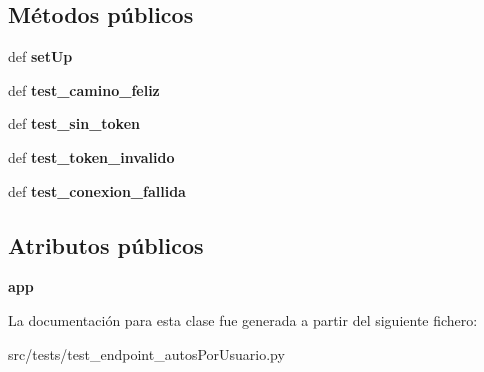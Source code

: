\subsection*{Métodos públicos}
\begin{DoxyCompactItemize}
\item 
\hypertarget{classsrc_1_1tests_1_1test__endpoint__autos_por_usuario_1_1_test_endpoint_autos_por_usuario_a3a4a1f4eaf7c91de538f0da6fb3a1982}{def {\bfseries set\-Up}}\label{classsrc_1_1tests_1_1test__endpoint__autos_por_usuario_1_1_test_endpoint_autos_por_usuario_a3a4a1f4eaf7c91de538f0da6fb3a1982}

\item 
\hypertarget{classsrc_1_1tests_1_1test__endpoint__autos_por_usuario_1_1_test_endpoint_autos_por_usuario_a81f833a96aa23aa8e2c96ef89afdaf64}{def {\bfseries test\-\_\-camino\-\_\-feliz}}\label{classsrc_1_1tests_1_1test__endpoint__autos_por_usuario_1_1_test_endpoint_autos_por_usuario_a81f833a96aa23aa8e2c96ef89afdaf64}

\item 
\hypertarget{classsrc_1_1tests_1_1test__endpoint__autos_por_usuario_1_1_test_endpoint_autos_por_usuario_a370a382ec1951a14be8cae43e0193ad6}{def {\bfseries test\-\_\-sin\-\_\-token}}\label{classsrc_1_1tests_1_1test__endpoint__autos_por_usuario_1_1_test_endpoint_autos_por_usuario_a370a382ec1951a14be8cae43e0193ad6}

\item 
\hypertarget{classsrc_1_1tests_1_1test__endpoint__autos_por_usuario_1_1_test_endpoint_autos_por_usuario_acfc970c6e00e009bd9082756be6dc9fd}{def {\bfseries test\-\_\-token\-\_\-invalido}}\label{classsrc_1_1tests_1_1test__endpoint__autos_por_usuario_1_1_test_endpoint_autos_por_usuario_acfc970c6e00e009bd9082756be6dc9fd}

\item 
\hypertarget{classsrc_1_1tests_1_1test__endpoint__autos_por_usuario_1_1_test_endpoint_autos_por_usuario_ace2136745a04641ef19b0385e66d40f9}{def {\bfseries test\-\_\-conexion\-\_\-fallida}}\label{classsrc_1_1tests_1_1test__endpoint__autos_por_usuario_1_1_test_endpoint_autos_por_usuario_ace2136745a04641ef19b0385e66d40f9}

\end{DoxyCompactItemize}
\subsection*{Atributos públicos}
\begin{DoxyCompactItemize}
\item 
\hypertarget{classsrc_1_1tests_1_1test__endpoint__autos_por_usuario_1_1_test_endpoint_autos_por_usuario_af2da830c2fb295032fc7d5bd93cc86a8}{{\bfseries app}}\label{classsrc_1_1tests_1_1test__endpoint__autos_por_usuario_1_1_test_endpoint_autos_por_usuario_af2da830c2fb295032fc7d5bd93cc86a8}

\end{DoxyCompactItemize}


La documentación para esta clase fue generada a partir del siguiente fichero\-:\begin{DoxyCompactItemize}
\item 
src/tests/test\-\_\-endpoint\-\_\-autos\-Por\-Usuario.\-py\end{DoxyCompactItemize}
